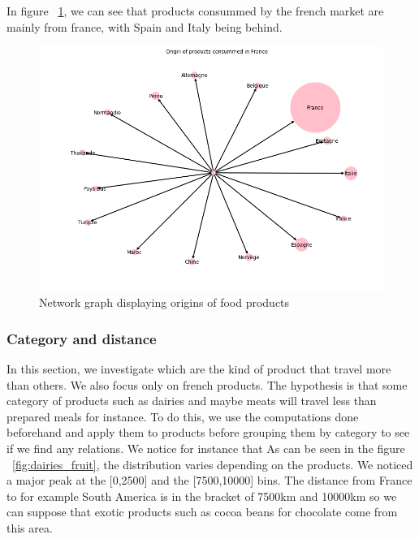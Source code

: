 \documentclass[11pt]{article}
\begin{document}
In figure ~\ref{fig:network_france}, we can see that products consummed by the french market are mainly from france, with Spain and Italy being behind. 
\vspace{-0.3cm}
\begin{figure}[H]
    \centering
    \includegraphics[scale=0.25]{figures/origin_food_france_network.png}
    \caption{Network graph displaying origins of food products}
    \label{fig:network_france}
\end{figure}


\subsubsection{Category and distance}
In this section, we investigate which are the kind of product that travel more than others. We also focus only on french products. 
The hypothesis is that some category of products such as dairies and maybe meats will travel less than prepared meals for instance. 
To do this, we use the computations done beforehand and apply them to products before grouping them by category to see if we find any relations. We notice for instance that  
As can be seen in the figure ~\ref{fig:dairies_fruit}, the distribution varies depending on the products. We noticed a major peak at the [0,2500] and the [7500,10000] bins. The distance from France to for example South America is in the bracket of 7500km and 10000km so we can suppose that exotic products such as cocoa beans for chocolate come from this area. 
\end{document}
